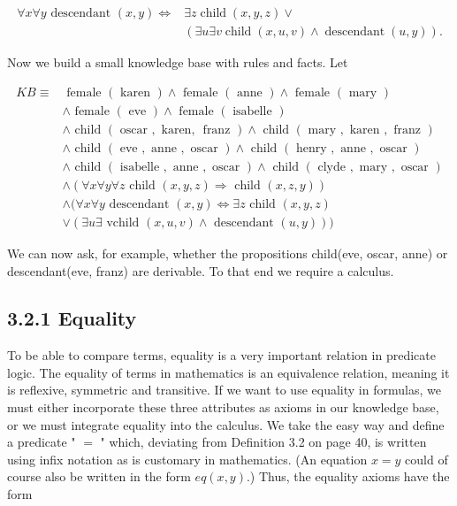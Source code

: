 \documentclass[10pt]{article}
\begin{document}
$$
\begin{aligned}
\forall x \forall y \text { descendant }(x, y) \Leftrightarrow & \exists z \operatorname{child}(x, y, z) \vee \\
& (\exists u \exists v \operatorname{child}(x, u, v) \wedge \operatorname{descendant}(u, y)) .
\end{aligned}
$$

Now we build a small knowledge base with rules and facts. Let

$$
\begin{aligned}
K B \equiv & \text { female }(\text { karen }) \wedge \text { female }(\text { anne }) \wedge \text { female }(\text { mary }) \\
& \wedge \text { female }(\text { eve }) \wedge \text { female }(\text { isabelle }) \\
& \wedge \text { child }(\text { oscar }, \text { karen, } \text { franz }) \wedge \text { child }(\text { mary }, \text { karen }, \text { franz }) \\
& \wedge \text { child }(\text { eve }, \text { anne }, \text { oscar }) \wedge \text { child }(\text { henry }, \text { anne }, \text { oscar }) \\
& \wedge \text { child }(\text { isabelle }, \text { anne }, \text { oscar }) \wedge \text { child }(\text { clyde }, \text { mary }, \text { oscar }) \\
& \wedge(\forall x \forall y \forall z \text { child }(x, y, z) \Rightarrow \text { child }(x, z, y)) \\
& \wedge(\forall x \forall y \text { descendant }(x, y) \Leftrightarrow \exists z \text { child }(x, y, z) \\
& \vee(\exists u \exists \text { vchild }(x, u, v) \wedge \text { descendant }(u, y)))
\end{aligned}
$$

We can now ask, for example, whether the propositions child(eve, oscar, anne) or descendant(eve, franz) are derivable. To that end we require a calculus.

\subsection*{3.2.1 Equality}
To be able to compare terms, equality is a very important relation in predicate logic. The equality of terms in mathematics is an equivalence relation, meaning it is reflexive, symmetric and transitive. If we want to use equality in formulas, we must either incorporate these three attributes as axioms in our knowledge base, or we must integrate equality into the calculus. We take the easy way and define a predicate " $=$ " which, deviating from Definition 3.2 on page 40, is written using infix notation as is customary in mathematics. (An equation $x=y$ could of course also be written in the form $e q(x, y)$.) Thus, the equality axioms have the form
\end{document}

